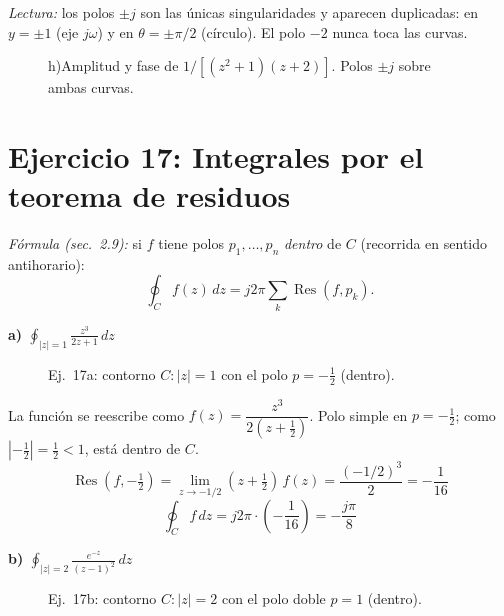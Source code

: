 \documentclass[10pt,a4paper]{article}
\begin{document}
\noindent\textit{Lectura:} los polos $\pm j$ son las únicas singularidades y aparecen duplicadas: en $y=\pm 1$ (eje $j\omega$) y en $\theta=\pm\pi/2$ (círculo). El polo $-2$ nunca toca las curvas.

\begin{figure}[H]\centering
	
	\caption{h)\enspace Amplitud y fase de $1/[(z^2+1)(z+2)]$. Polos $\pm j$ sobre ambas curvas.}
	\label{fig:resp16h}
\end{figure}

\section*{Ejercicio 17: Integrales por el teorema de residuos}

\noindent\textit{Fórmula (sec.~2.9):} si $f$ tiene polos $p_1,\ldots,p_n$ \emph{dentro} de $C$ (recorrida en sentido antihorario):
\[
	\oint_C f(z)\,dz = j2\pi\sum_k \operatorname{Res}(f,p_k).
\]

\bigskip

\noindent\textbf{a) $\displaystyle\oint_{|z|=1}\frac{z^3}{2z+1}\,dz$}

\begin{figure}[H]\centering
	
	\caption{Ej.~17a: contorno $C:|z|=1$ con el polo $p=-\tfrac{1}{2}$ (dentro).}
	\label{fig:tray17a}
\end{figure}
 
La función se reescribe como $f(z)=\dfrac{z^3}{2(z+\frac{1}{2})}$. Polo simple en $p=-\tfrac{1}{2}$; como $\left|-\tfrac{1}{2}\right|=\tfrac{1}{2}<1$, está dentro de $C$.
\[
	\operatorname{Res}\!\left(f,-\tfrac{1}{2}\right)
	= \lim_{z\to-1/2}(z+\tfrac{1}{2})\,f(z)
	= \frac{(-1/2)^3}{2} = -\frac{1}{16}
\]
\[
	\boxed{\oint_C f\,dz = j2\pi\cdot\!\left(-\frac{1}{16}\right) = -\frac{j\pi}{8}}
\]

\bigskip

\noindent\textbf{b) $\displaystyle\oint_{|z|=2}\frac{e^{-z}}{(z-1)^2}\,dz$}

\begin{figure}[H]\centering
	
	\caption{Ej.~17b: contorno $C:|z|=2$ con el polo doble $p=1$ (dentro).}
	\label{fig:tray17b}
\end{figure}
\end{document}
